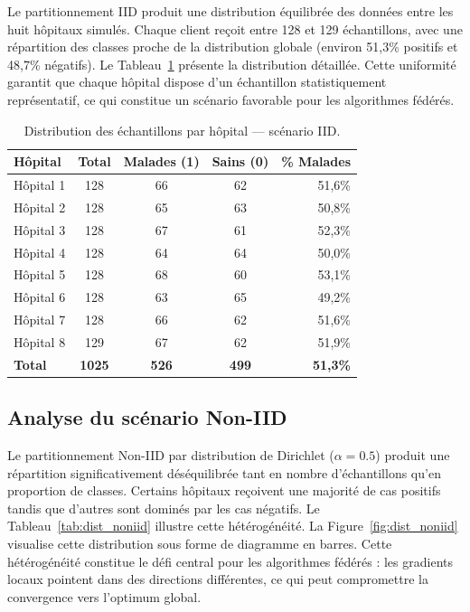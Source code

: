 \documentclass[12pt,a4paper]{report}
\begin{document}
Le partitionnement IID produit une distribution \'{e}quilibr\'{e}e des donn\'{e}es entre les huit h\^{o}pitaux simul\'{e}s. Chaque client re\c{c}oit entre 128 et 129 \'{e}chantillons, avec une r\'{e}partition des classes proche de la distribution globale (environ 51,3\% positifs et 48,7\% n\'{e}gatifs). Le Tableau~\ref{tab:dist_iid} pr\'{e}sente la distribution d\'{e}taill\'{e}e. Cette uniformit\'{e} garantit que chaque h\^{o}pital dispose d'un \'{e}chantillon statistiquement repr\'{e}sentatif, ce qui constitue un sc\'{e}nario favorable pour les algorithmes f\'{e}d\'{e}r\'{e}s.

\begin{table}[H]
\centering
\caption{Distribution des \'{e}chantillons par h\^{o}pital --- sc\'{e}nario IID.}
\label{tab:dist_iid}
\begin{tabular}{lcccr}
\toprule
\textbf{H\^{o}pital} & \textbf{Total} & \textbf{Malades (1)} & \textbf{Sains (0)} & \textbf{\% Malades} \\
\midrule
H\^{o}pital 1 & 128 & 66 & 62 & 51,6\% \\
H\^{o}pital 2 & 128 & 65 & 63 & 50,8\% \\
H\^{o}pital 3 & 128 & 67 & 61 & 52,3\% \\
H\^{o}pital 4 & 128 & 64 & 64 & 50,0\% \\
H\^{o}pital 5 & 128 & 68 & 60 & 53,1\% \\
H\^{o}pital 6 & 128 & 63 & 65 & 49,2\% \\
H\^{o}pital 7 & 128 & 66 & 62 & 51,6\% \\
H\^{o}pital 8 & 129 & 67 & 62 & 51,9\% \\
\midrule
\textbf{Total} & \textbf{1025} & \textbf{526} & \textbf{499} & \textbf{51,3\%} \\
\bottomrule
\end{tabular}
\end{table}

\subsection{Analyse du sc\'{e}nario Non-IID}

Le partitionnement Non-IID par distribution de Dirichlet ($\alpha = 0.5$) produit une r\'{e}partition significativement d\'{e}s\'{e}quilibr\'{e}e tant en nombre d'\'{e}chantillons qu'en proportion de classes. Certains h\^{o}pitaux re\c{c}oivent une majorit\'{e} de cas positifs tandis que d'autres sont domin\'{e}s par les cas n\'{e}gatifs. Le Tableau~\ref{tab:dist_noniid} illustre cette h\'{e}t\'{e}rog\'{e}n\'{e}it\'{e}. La Figure~\ref{fig:dist_noniid} visualise cette distribution sous forme de diagramme en barres. Cette h\'{e}t\'{e}rog\'{e}n\'{e}it\'{e} constitue le d\'{e}fi central pour les algorithmes f\'{e}d\'{e}r\'{e}s : les gradients locaux pointent dans des directions diff\'{e}rentes, ce qui peut compromettre la convergence vers l'optimum global.
\end{document}
